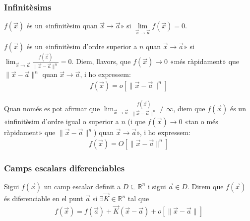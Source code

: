 \subsubsection*{Infinitèsims}
\begin{defi}
    $f(\vec{x})$ és un «infinitèsim quan $\vec{x} \to \vec{a}$» si $\lim\limits_{\vec{x} \to \vec{a}} f(\vec{x}) = 0$.
\end{defi}
\begin{defi}
    $f(\vec{x})$ és un «infinitèsim d'ordre superior a $n$ quan $\vec{x} \to \vec{a}$» si $\displaystyle \lim_{\vec{x} \to \vec{a}} \frac{f(\vec{x})}{\| \vec{x} - \vec{a} \|^{n}} = 0$. Diem, llavors, que $f(\vec{x}) \to 0$ «més ràpidament» que $\| \vec{x} - \vec{a} \|^{n}$ quan $\vec{x} \to \vec{a}$, i ho expressem: 
    \begin{align*}
        f(\vec{x}) = o[\| \vec{x} - \vec{a} \|^{n}]
    \end{align*}
\end{defi}
\begin{defi}
    Quan només es pot afirmar que $\displaystyle \lim_{\vec{x} \to \vec{a}} \frac{f(\vec{x})}{\| \vec{x} - \vec{a} \|^{n}} \neq \infty$, diem que $f(\vec{x})$ és un «infinitèsim d'ordre igual o superior a $n$ (i que $f(\vec{x}) \to 0$ «tan o més ràpidament» que $\| \vec{x} - \vec{a} \|^{n}$) quan $\vec{x} \to \vec{a}$», i ho expressem:
    \begin{align*}
        f(\vec{x}) = O[\| \vec{x} - \vec{a} \|^{n}]
    \end{align*}
\end{defi}

\subsubsection*{Camps escalars diferenciables}
\begin{defi}
    Sigui $f(\vec{x})$ un camp escalar definit a $D \subseteq \mathbb{R}^{n}$ i sigui $\vec{a} \in D$. Direm que $f(\vec{x})$ és diferenciable en el punt $\vec{a}$ si $\exists \vec{K} \in \mathbb{R}^{n}$ tal que
    \begin{align}
        f(\vec{x}) = f(\vec{a}) + \vec{K} (\vec{x} - \vec{a}) + o[\| \vec{x} - \vec{a} \|]
    \end{align}
\end{defi}

